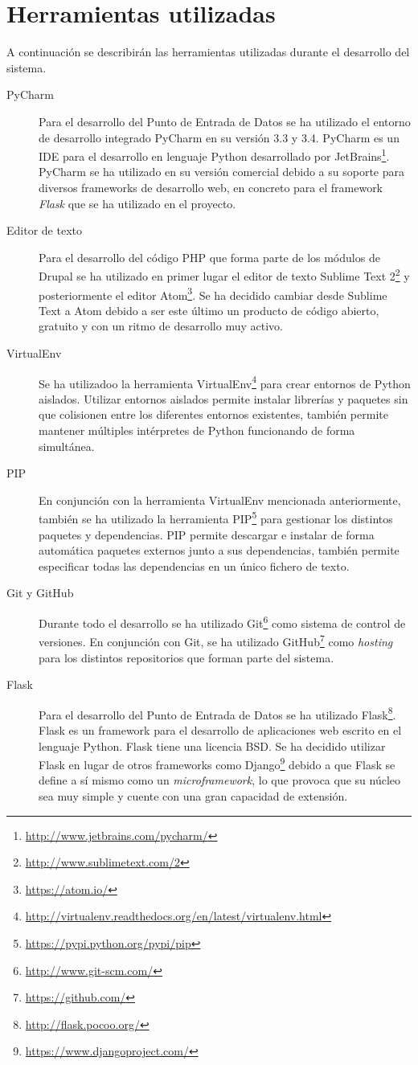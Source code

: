 \section{Herramientas utilizadas}
\label{implementacion:herramientas_utilizadas}

A continuación se describirán las herramientas utilizadas durante el desarrollo del sistema.
\begin{description}
	\item[PyCharm]
		Para el desarrollo del Punto de Entrada de Datos se ha utilizado el entorno de desarrollo integrado PyCharm en su versión 3.3 y 3.4.  PyCharm es un IDE para el desarrollo en lenguaje Python desarrollado por JetBrains\footnote{\url{http://www.jetbrains.com/pycharm/}}.  PyCharm se ha utilizado en su versión comercial debido a su soporte para diversos frameworks de desarrollo web, en concreto para el framework \textit{Flask} que se ha utilizado en el proyecto.
	\item[Editor de texto]
		Para el desarrollo del código PHP que forma parte de los módulos de Drupal se ha utilizado en primer lugar el editor de texto Sublime Text 2\footnote{\url{http://www.sublimetext.com/2}} y posteriormente el editor Atom\footnote{\url{https://atom.io/}}.  Se ha decidido cambiar desde Sublime Text a Atom debido a ser este último un producto de código abierto, gratuito y con un ritmo de desarrollo muy activo.
	\item[VirtualEnv]
		Se ha utilizadoo la herramienta VirtualEnv\footnote{\url{http://virtualenv.readthedocs.org/en/latest/virtualenv.html}} para crear entornos de Python aislados.  Utilizar entornos aislados permite instalar librerías y paquetes sin que colisionen entre los diferentes entornos existentes, también permite mantener múltiples intérpretes de Python funcionando de forma simultánea.
	\item[PIP]
		En conjunción con la herramienta VirtualEnv mencionada anteriormente, también se ha utilizado la herramienta PIP\footnote{\url{https://pypi.python.org/pypi/pip}} para gestionar los distintos paquetes y dependencias.  PIP permite descargar e instalar de forma automática paquetes externos junto a sus dependencias, también permite especificar todas las dependencias en un único fichero de texto.
	\item[Git y GitHub]
		Durante todo el desarrollo se ha utilizado Git\footnote{\url{http://www.git-scm.com/}} como sistema de control de versiones.  En conjunción con Git, se ha utilizado GitHub\footnote{\url{https://github.com/}} como \textit{hosting} para los distintos repositorios que forman parte del sistema.
	\item[Flask]
		Para el desarrollo del Punto de Entrada de Datos se ha utilizado Flask\footnote{\url{http://flask.pocoo.org/}}. Flask es un framework para el desarrollo de aplicaciones web escrito en el lenguaje Python.  Flask tiene una licencia BSD.  Se ha decidido utilizar Flask en lugar de otros frameworks como Django\footnote{\url{https://www.djangoproject.com/}} debido a que Flask se define a sí mismo como un \textit{microframework}, lo que provoca que su núcleo sea muy simple y cuente con una gran capacidad de extensión.
\end{description}


